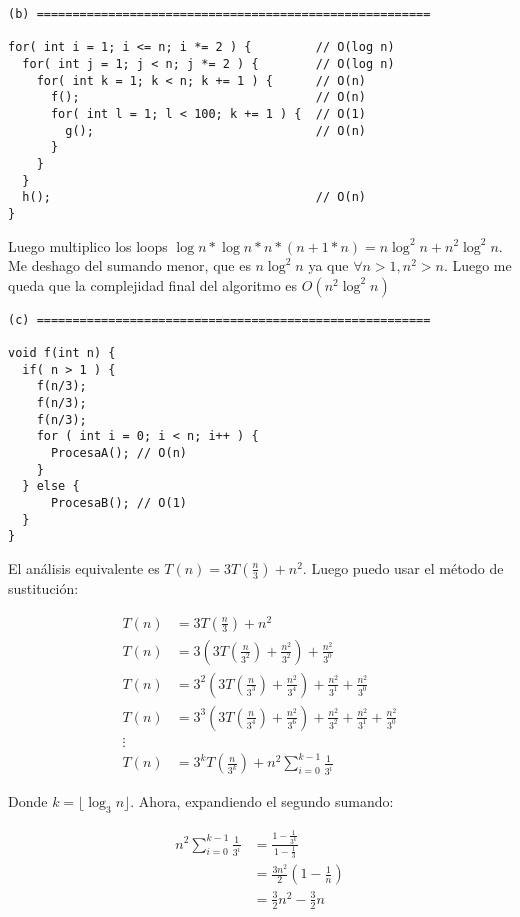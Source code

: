 \documentclass[10pt]{article}
\begin{document}
\begin{enumerate}
\begin{verbatim}
(b) =======================================================

for( int i = 1; i <= n; i *= 2 ) {         // O(log n)
  for( int j = 1; j < n; j *= 2 ) {        // O(log n)
    for( int k = 1; k < n; k += 1 ) {      // O(n)
      f();                                 // O(n)
      for( int l = 1; l < 100; k += 1 ) {  // O(1)
        g();                               // O(n)
      }
    }
  }
  h();                                     // O(n)
}
\end{verbatim}

Luego multiplico los loops $\log n * \log n * n * (n + 1 * n) = n \log^2 n + n^2 \log^2 n$. Me deshago del sumando menor, que es $n \log^2 n$ ya que $\forall n > 1, n^2 > n$. Luego me queda que la complejidad final del algoritmo es $O(n^2 \log^2 n)$

\begin{verbatim}
(c) =======================================================

void f(int n) {
  if( n > 1 ) {
    f(n/3);
    f(n/3);
    f(n/3);
    for ( int i = 0; i < n; i++ ) {
      ProcesaA(); // O(n)
    }
  } else {
      ProcesaB(); // O(1)
  }
}
\end{verbatim}

El análisis equivalente es $T(n) = 3T(\frac{n}{3})+n^2$. Luego puedo usar el método de sustitución:

\begin{align*}
	T(n) &= 3T(\frac{n}{3}) + n^2 \\
	T(n) &= 3(3T(\frac{n}{3^2}) + \frac{n^2}{3^2}) + \frac{n^2}{3^0} \\
	T(n) &= 3^2(3T(\frac{n}{3^3}) + \frac{n^2}{3^4}) + \frac{n^2}{3^1} + \frac{n^2}{3^0} \\
	T(n) &= 3^3(3T(\frac{n}{3^4}) + \frac{n^2}{3^6}) + \frac{n^2}{3^2} + \frac{n^2}{3^1} + \frac{n^2}{3^0} \\
	\vdots \\
	T(n) &= 3^kT(\frac{n}{3^k})+n^2\sum_{i=0}^{k-1}\frac{1}{3^i}
\end{align*}

Donde $k=\lfloor \log_3 n \rfloor$. Ahora, expandiendo el segundo sumando:

\begin{align*}
	n^2\sum_{i=0}^{k-1}\frac{1}{3^i} &= \frac{1-\frac{1}{3^k}}{1-\frac{1}{3}} \\
	&=\frac{3n^2}{2}(1-\frac{1}{n})\\
	&=\frac{3}{2}n^2-\frac{3}{2}n
\end{align*}


\end{enumerate}
\end{document}
